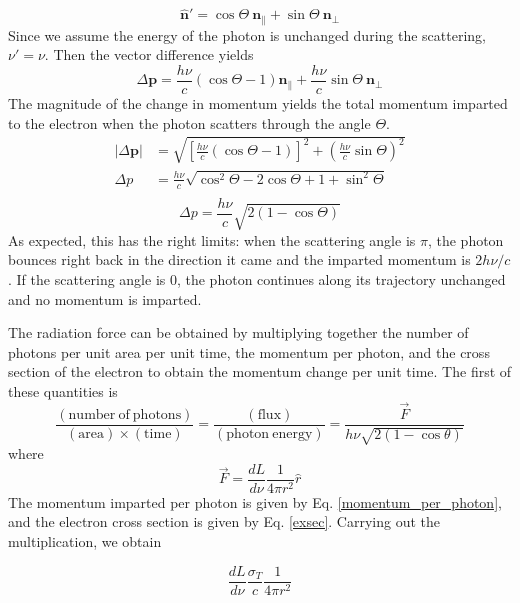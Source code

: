 \documentclass{article}
\begin{document}
%
\begin{equation}
    \mathbf{\hat n'} = \cos \Theta \ \mathbf{n_\parallel} + \sin \Theta\  \mathbf{n_\perp}
\end{equation}
%
Since we assume the energy of the photon is unchanged during the scattering, $\nu' = \nu$. Then the vector difference yields
%
\begin{equation}
    \Delta \mathbf{p} = \frac{h\nu}{c}\left(\cos \Theta - 1\right) \mathbf{n_\parallel} + \frac{h\nu}{c}\sin \Theta \ \mathbf{n_\perp}
\end{equation}
%
The magnitude of the change in momentum yields the total momentum imparted to the electron when the photon scatters through the angle $\Theta$. 
%
\begin{equation*}
\begin{split}
    |\Delta \mathbf{p}| &= \sqrt{\left[\frac{h\nu}{c}\left(\cos \Theta - 1\right)\right]^2 + \left(\frac{h\nu}{c}\sin \Theta\right)^2}\\
    \Delta p &= \frac{h\nu}{c}\sqrt{\cos ^2 \Theta - 2 \cos \Theta + 1 + \sin ^2\Theta}\\
    \end{split}
\end{equation*}
%
\begin{equation} \label{momentum_per_photon}
    \boxed{\Delta p = \frac{h\nu}{c}\sqrt{2\left(1 - \cos \Theta \right)}}
\end{equation}
%
As expected, this has the right limits: when the scattering angle is $\pi$, the photon bounces right back in the direction it came and the imparted momentum is $2h\nu/c$. If the scattering angle is $0$, the photon continues along its trajectory unchanged and no momentum is imparted. 

The radiation force can be obtained by multiplying together the number of photons per unit area per unit time, the momentum per photon, and the cross section of the electron to obtain the momentum change per unit time. The first of these quantities is
%
\begin{equation}
    \frac{\left(\mathrm{number\ of\ photons}\right)}{\left(\mathrm{area}\right)\times\left(\mathrm{time}\right)} = \frac{\left(\mathrm{flux}\right)}{\left(\mathrm{photon\ energy}\right)} =  \frac{\vec{F}}{h\nu\sqrt{2\left(1-\cos \theta \right)}}
\end{equation}
%
where 
%
\begin{equation}
    \vec{F} = \frac{dL}{d\nu}\frac{1}{4\pi r^2}\hat{r}
\end{equation}
%
The momentum imparted per photon is given by Eq. \ref{momentum_per_photon}, and the electron cross section is given by Eq. \ref{exsec}. Carrying out the multiplication, we obtain

\begin{equation}
    \frac{dL}{d\nu}\frac{\sigma_T}{c}\frac{1}{4\pi r^2}
\end{equation}
\end{document}
